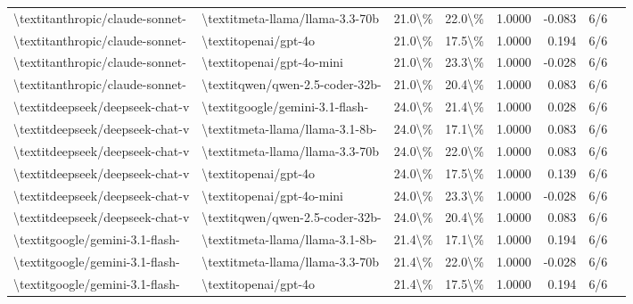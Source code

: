 \begin{table}[htbp]
{\begin{tabular}{ll|rrrrrl}
\textbackslash{}textit{anthropic/claude-sonnet-} & \textbackslash{}textit{meta-llama/llama-3.3-70b} & 21.0\textbackslash{}\% & 22.0\textbackslash{}\% & 1.0000 & -0.083 & 6/6 \\
\textbackslash{}textit{anthropic/claude-sonnet-} & \textbackslash{}textit{openai/gpt-4o} & 21.0\textbackslash{}\% & 17.5\textbackslash{}\% & 1.0000 & 0.194 & 6/6 \\
\textbackslash{}textit{anthropic/claude-sonnet-} & \textbackslash{}textit{openai/gpt-4o-mini} & 21.0\textbackslash{}\% & 23.3\textbackslash{}\% & 1.0000 & -0.028 & 6/6 \\
\textbackslash{}textit{anthropic/claude-sonnet-} & \textbackslash{}textit{qwen/qwen-2.5-coder-32b-} & 21.0\textbackslash{}\% & 20.4\textbackslash{}\% & 1.0000 & 0.083 & 6/6 \\
\textbackslash{}textit{deepseek/deepseek-chat-v} & \textbackslash{}textit{google/gemini-3.1-flash-} & 24.0\textbackslash{}\% & 21.4\textbackslash{}\% & 1.0000 & 0.028 & 6/6 \\
\textbackslash{}textit{deepseek/deepseek-chat-v} & \textbackslash{}textit{meta-llama/llama-3.1-8b-} & 24.0\textbackslash{}\% & 17.1\textbackslash{}\% & 1.0000 & 0.083 & 6/6 \\
\textbackslash{}textit{deepseek/deepseek-chat-v} & \textbackslash{}textit{meta-llama/llama-3.3-70b} & 24.0\textbackslash{}\% & 22.0\textbackslash{}\% & 1.0000 & 0.083 & 6/6 \\
\textbackslash{}textit{deepseek/deepseek-chat-v} & \textbackslash{}textit{openai/gpt-4o} & 24.0\textbackslash{}\% & 17.5\textbackslash{}\% & 1.0000 & 0.139 & 6/6 \\
\textbackslash{}textit{deepseek/deepseek-chat-v} & \textbackslash{}textit{openai/gpt-4o-mini} & 24.0\textbackslash{}\% & 23.3\textbackslash{}\% & 1.0000 & -0.028 & 6/6 \\
\textbackslash{}textit{deepseek/deepseek-chat-v} & \textbackslash{}textit{qwen/qwen-2.5-coder-32b-} & 24.0\textbackslash{}\% & 20.4\textbackslash{}\% & 1.0000 & 0.083 & 6/6 \\
\textbackslash{}textit{google/gemini-3.1-flash-} & \textbackslash{}textit{meta-llama/llama-3.1-8b-} & 21.4\textbackslash{}\% & 17.1\textbackslash{}\% & 1.0000 & 0.194 & 6/6 \\
\textbackslash{}textit{google/gemini-3.1-flash-} & \textbackslash{}textit{meta-llama/llama-3.3-70b} & 21.4\textbackslash{}\% & 22.0\textbackslash{}\% & 1.0000 & -0.028 & 6/6 \\
\textbackslash{}textit{google/gemini-3.1-flash-} & \textbackslash{}textit{openai/gpt-4o} & 21.4\textbackslash{}\% & 17.5\textbackslash{}\% & 1.0000 & 0.194 & 6/6 \\

\end{tabular}}
\end{table}
